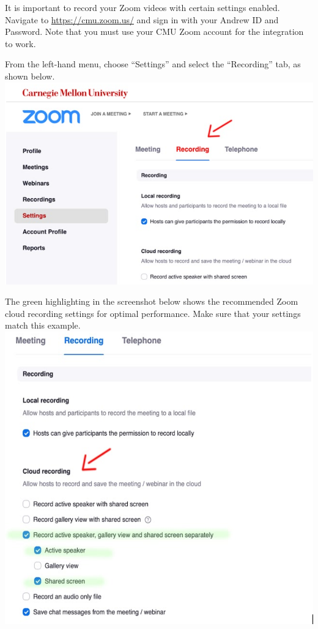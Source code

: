 \begin{gram}[Step 1/2]
	It is important to record your Zoom videos with certain settings enabled. Navigate to \href{https://cmu.zoom.us/}{https://cmu.zoom.us/} and sign in with your Andrew ID and Password. Note that you must use your CMU Zoom account for the integration to work.

	From the left-hand menu, choose ``Settings'' and select the ``Recording'' tab, as shown below.
{
\centering
\includegraphics[scale=0.7]{panopto/media/03-recording.png}
}

	The green highlighting in the screenshot below shows the recommended Zoom cloud recording settings for optimal performance. Make sure that your settings match this example.
{
		\includegraphics[scale=0.5]{panopto/media/04-settings.png}
}
\end{gram}

